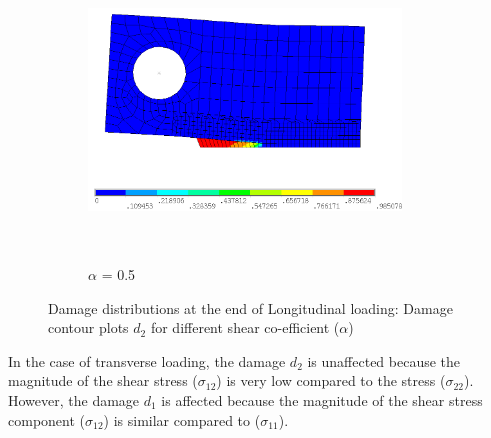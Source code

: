 \documentclass[a4paper,12pt,twoside]{report}
\begin{document}
\begin{figure}[htbp!]
       \captionsetup[subfigure]{justification=centering}
     \begin{subfigure}{0.4\textwidth}
        \centering
         \includegraphics[width=8.3cm,height=8cm,keepaspectratio]{26.d2_a_0.5.png}
         \centering
         \caption{$\alpha$ = 0.5}
         \label{fig:d2-a_0.5}
     \end{subfigure}
        \caption{Damage distributions at the end of Longitudinal loading: Damage contour plots $d_{2}$ for different shear co-efficient ($\alpha$)}
        \label{fig:Damage contour plots alpha d2} 
\end{figure}
\FloatBarrier
\indent\indent\indent In the case of transverse loading, the damage  $d_{2}$ is unaffected because the magnitude of the shear stress ($\sigma_{12}$) is very low compared to the stress ($\sigma_{22}$). However, the damage $d_{1}$ is affected because the magnitude of the shear stress component ($\sigma_{12}$) is similar compared to ($\sigma_{11}$).
\end{document}
